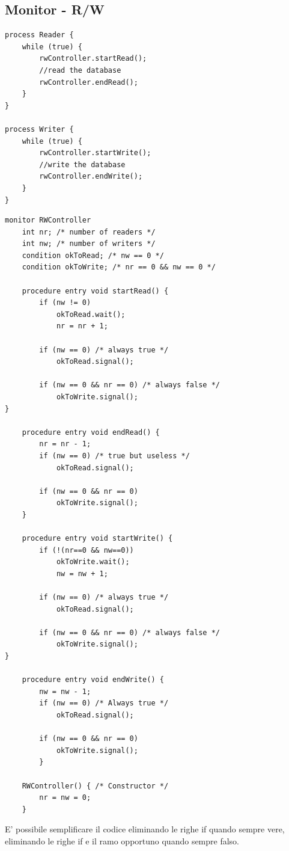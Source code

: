 \subsection{Monitor - R/W}
\begin{lstlisting}
process Reader {
    while (true) {
        rwController.startRead();
        //read the database
        rwController.endRead();
    }
}

process Writer {
    while (true) {
        rwController.startWrite();
        //write the database
        rwController.endWrite();
    }
}
\end{lstlisting}
\newpage
\begin{lstlisting}
monitor RWController
    int nr; /* number of readers */
    int nw; /* number of writers */
    condition okToRead; /* nw == 0 */
    condition okToWrite; /* nr == 0 && nw == 0 */

    procedure entry void startRead() {
        if (nw != 0)
            okToRead.wait();
            nr = nr + 1;

        if (nw == 0) /* always true */
            okToRead.signal();
        
        if (nw == 0 && nr == 0) /* always false */
            okToWrite.signal();
}

    procedure entry void endRead() {
        nr = nr - 1;
        if (nw == 0) /* true but useless */
            okToRead.signal();

        if (nw == 0 && nr == 0)
            okToWrite.signal();
    }

    procedure entry void startWrite() {
        if (!(nr==0 && nw==0))
            okToWrite.wait();
            nw = nw + 1;

        if (nw == 0) /* always true */
            okToRead.signal();

        if (nw == 0 && nr == 0) /* always false */
            okToWrite.signal();
}

    procedure entry void endWrite() {
        nw = nw - 1;
        if (nw == 0) /* Always true */
            okToRead.signal();
        
        if (nw == 0 && nr == 0)
            okToWrite.signal();
        }

    RWController() { /* Constructor */
        nr = nw = 0;
    }

\end{lstlisting}

E' possibile semplificare il codice eliminando le righe if quando sempre vere, eliminando le righe if e il ramo opportuno quando sempre falso.
\newpage
